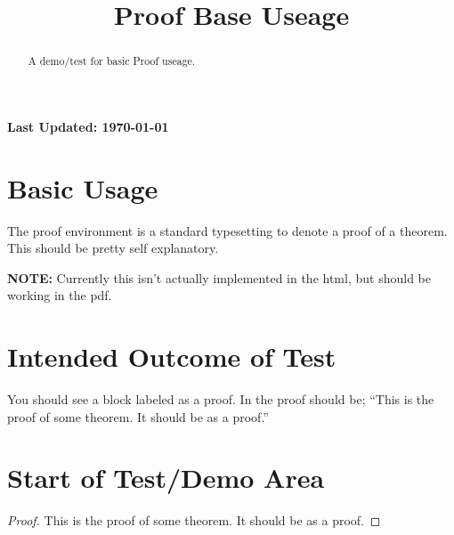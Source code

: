 \documentclass{ximera}
\title{Proof Base Useage}
\begin{document}
\begin{abstract}
    A demo/test for basic Proof useage.
\end{abstract}
\maketitle

{{\Huge \bfseries Last Updated: \today}} \\


\section{Basic Usage}
The proof environment is a standard typesetting to denote a proof of a theorem. This should be pretty self explanatory.

\textbf{NOTE:} Currently this isn't actually implemented in the html, but should be working in the pdf.

\section{Intended Outcome of Test}
You should see a block labeled as a proof. In the proof should be;
``This is the proof of some theorem. It should be as a proof.''

\section{Start of Test/Demo Area}
\begin{proof}
    This is the proof of some theorem. It should be as a proof.
\end{proof}

\hrulefill
\end{document}
